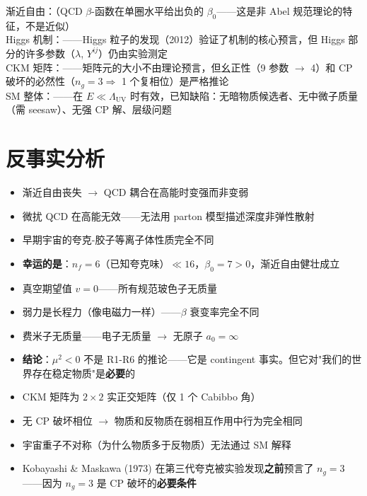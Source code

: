 \precisionbox[SM 推论精度]
  渐近自由：\precexact（QCD $\beta$-函数在单圈水平给出负的 $\beta_0$——这是非 Abel 规范理论的特征，不是近似）\\
  Higgs 机制：\preceffective——Higgs 粒子的发现（2012）验证了机制的核心预言，但 Higgs 部分的许多参数（$\lambda$, $Y^{ij}$）仍由实验测定\\
  CKM 矩阵：\preccontingent——矩阵元的大小不由理论预言，但幺正性（9 参数 $\to$ 4）和 CP 破坏的必然性（$n_g=3 \Rightarrow$ 1 个复相位）是严格推论\\
  SM 整体：\preceffective——在 $E \ll \Lambda_{\text{UV}}$ 时有效，已知缺陷：无暗物质候选者、无中微子质量（需 seesaw）、无强 CP 解、层级问题
\endprecisionbox

\section*{反事实分析}

\begin{limitbox}[若无 $n_f \le 16$ 条件（$\beta_0$ 变号）]
  \begin{itemize}
    \item 渐近自由丧失 $\to$ QCD 耦合在高能时变强而非变弱
    \item 微扰 QCD 在高能无效——无法用 parton 模型描述深度非弹性散射
    \item 早期宇宙的夸克-胶子等离子体性质完全不同
    \item \textbf{幸运的是}：$n_f=6$（已知夸克味）$\ll 16$，$\beta_0 = 7 > 0$，渐近自由健壮成立
  \end{itemize}
\end{limitbox}

\begin{limitbox}
  \begin{itemize}
    \item 真空期望值 $v=0$——所有规范玻色子无质量
    \item 弱力是长程力（像电磁力一样）——$\beta$ 衰变率完全不同
    \item 费米子无质量——电子无质量 $\to$ 无原子 $a_0 = \infty$
    \item \textbf{结论}：$\mu^2<0$ 不是 R1-R6 的推论——它是 contingent 事实。但它对"我们的世界存在稳定物质"是\textbf{必要}的
  \end{itemize}
\end{limitbox}

\begin{limitbox}[若只有 $n_g=2$ 代费米子（无 CP 破坏）]
  \begin{itemize}
    \item CKM 矩阵为 $2\times2$ 实正交矩阵（仅 1 个 Cabibbo 角）
    \item 无 CP 破坏相位 $\to$ 物质和反物质在弱相互作用中行为完全相同
    \item 宇宙重子不对称（为什么物质多于反物质）无法通过 SM 解释
    \item Kobayashi \& Maskawa (1973) 在第三代夸克被实验发现\textbf{之前}预言了 $n_g=3$——因为 $n_g=3$ 是 CP 破坏的\textbf{必要条件}
  \end{itemize}
\end{limitbox}
